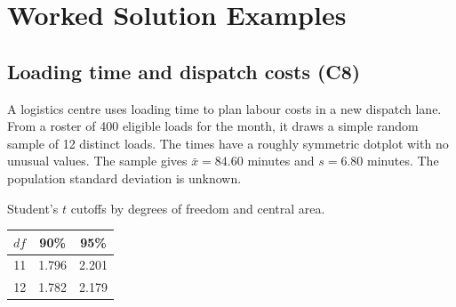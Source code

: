 	\section{Worked Solution Examples}
	\label{sec:worked-solution-examples}


	\subsection{Loading time and dispatch costs (C8)}
	\label{prob:c8-1}

	\noindent
	\begin{minipage}[t]{0.53\textwidth}
	\vspace{0pt}
	A logistics centre uses loading time to plan labour costs in a new dispatch lane. From a roster of 400 eligible loads for the month, it draws a simple random sample of 12 distinct loads. The times have a roughly symmetric dotplot with no unusual values. The sample gives $\bar x=84.60$ minutes and $s=6.80$ minutes. The population standard deviation is unknown.
	\end{minipage}
	\hfill
	\begin{minipage}[t]{0.43\textwidth}
	\vspace{0pt}
	\centering\small
	Student's $t$ cutoffs by degrees of freedom and central area.\par\smallskip
	\begin{tabular}{@{}rcc@{}}
	\toprule
	$df$ & 90\% & 95\% \\
	\midrule
	11 & 1.796 & 2.201 \\
	12 & 1.782 & 2.179 \\
	\bottomrule
	\end{tabular}
	\end{minipage}


	\clearpage

	\label{sol:c8-1-a}
